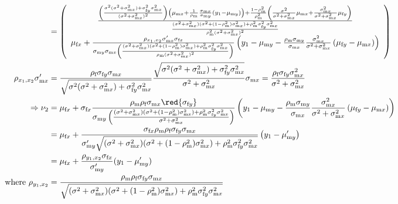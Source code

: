 \documentclass{article}
\newcommand{\x}[1]{\text{#1}}
\begin{document}
\begin{landscape}
\begin{align*}
\\&=\left(\begin{array}{cc}\frac{\left(\frac{\sigma^2(\sigma^2+\sigma_{\x{m}x}^2)+\sigma_{\x{f}y}^2\sigma_{\x{m}x}^2}{(\sigma^2+\sigma_{\x{m}x}^2)^2}\right)\left(\mu_{\x{m}x}+\frac{1}{\rho_\x{m}}\frac{\sigma_{\x{m}x}}{\sigma_{\x{m}y}}(y_1-\mu_{\x{m}y})\right)+\frac{1-\rho_\x{m}^2}{\rho_\x{m}^2}\left(\frac{\sigma^2}{\sigma^2+\sigma_{\x{m}x}^2}\mu_{\x{m}x}+\frac{\sigma_{\x{m}x}^2}{\sigma^2+\sigma_{\x{m}x}^2}\mu_{\x{f}y}\right)}{\frac{(\sigma^2+\sigma_{\x{m}x}^2)(\sigma^2+(1-\rho_\x{m}^2)\sigma_{\x{m}x}^2)+\rho_\x{m}^2\sigma_{\x{f}y}^2\sigma_{\x{m}x}^2}{\rho_\x{m}^2(\sigma^2+\sigma_{\x{m}x}^2)^2}} \\ \mu_{\x{f}x}+\frac{\rho_{x_1,x_2}\sigma_{\x{m}x}'\sigma_{\x{f}x}}{\sigma_{\x{m}y}\sigma_{\x{m}x}\left(\frac{(\sigma^2+\sigma_{\x{m}x}^2)(\sigma^2+(1-\rho_\x{m}^2)\sigma_{\x{m}x}^2)+\rho_\x{m}^2\sigma_{\x{f}y}^2\sigma_{\x{m}x}^2}{\rho_\x{m}(\sigma^2+\sigma_{\x{m}x}^2)^2}\right)}\left(y_1-\mu_{\x{m}y}-\frac{\rho_\x{m}\sigma_{\x{m}y}}{\sigma_{\x{m}x}}\frac{\sigma_{\x{m}x}^2}{\sigma^2+\sigma_{\x{m}x}^2}\left(\mu_{\x{f}y}-\mu_{\x{m}x}\right)\right) \end{array}\right)
\\ \rho_{x_1,x_2}\sigma_{\x{m}x}'&=\frac{\rho_\x{f}\sigma_{\x{f}y}\sigma_{\x{m}x}}{\sqrt{\sigma^2(\sigma^2+\sigma_{\x{m}x}^2)+\sigma_{\x{f}y}^2\sigma_{\x{m}x}^2}}\frac{\sqrt{\sigma^2(\sigma^2+\sigma_{\x{m}x}^2)+\sigma_{\x{f}y}^2\sigma_{\x{m}x}^2}}{\sigma^2+\sigma_{\x{m}x}^2}\sigma_{\x{m}x}=\frac{\rho_\x{f}\sigma_{\x{f}y}\sigma_{\x{m}x}^2}{\sigma^2+\sigma_{\x{m}x}^2}
\\ \Rightarrow \nu_2&= \mu_{\x{f}x}+\sigma_{\x{f}x}\frac{\rho_\x{m}\rho_\x{f}\sigma_{\x{m}x}\red{\sigma_{\x{f}y}}}{\sigma_{\x{m}y}\left(\frac{(\sigma^2+\sigma_{\x{m}x}^2)(\sigma^2+(1-\rho_\x{m}^2)\sigma_{\x{m}x}^2)+\rho_\x{m}^2\sigma_{\x{f}y}^2\sigma_{\x{m}x}^2}{\sigma^2+\sigma_{\x{m}x}^2}\right)}\left(y_1-\mu_{\x{m}y}-\frac{\rho_\x{m}\sigma_{\x{m}y}}{\sigma_{\x{m}x}}\frac{\sigma_{\x{m}x}^2}{\sigma^2+\sigma_{\x{m}x}^2}\left(\mu_{\x{f}y}-\mu_{\x{m}x}\right)\right)
\\&= \mu_{\x{f}x}+\frac{\sigma_{\x{f}x}\rho_\x{m}\rho_\x{f}\sigma_{\x{f}y}\sigma_{\x{m}x}}{\sigma_{\x{m}y}'\sqrt{(\sigma^2+\sigma_{\x{m}x}^2)(\sigma^2+(1-\rho_\x{m}^2)\sigma_{\x{m}x}^2)+\rho_\x{m}^2\sigma_{\x{f}y}^2\sigma_{\x{m}x}^2}}\left(y_1-\mu_{\x{m}y}'\right)
\\&=\mu_{\x{f}x}+\frac{\rho_{y_1,x_2}\sigma_{\x{f}x}}{\sigma_{\x{m}y}'}(y_1-\mu_{\x{m}y}')
\\ \text{ where } \rho_{y_1,x_2}&=\frac{\rho_\x{m}\rho_\x{f}\sigma_{\x{f}y}\sigma_{\x{m}x}}{\sqrt{(\sigma^2+\sigma_{\x{m}x}^2)(\sigma^2+(1-\rho_\x{m}^2)\sigma_{\x{m}x}^2)+\rho_\x{m}^2\sigma_{\x{f}y}^2\sigma_{\x{m}x}^2}}

\end{align*}
\end{landscape}
\end{document}
